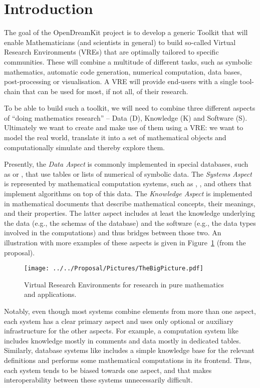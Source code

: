 \section{Introduction}\label{sec:intro}

The goal of the OpenDreamKit project \cite{ODKproposal:on} is to develop a generic Toolkit
that will enable Mathematicians (and scientists in general) to build so-called Virtual
Research Environments (VREs) that are optimally tailored to specific communities. These
will combine a multitude of different tasks, such as symbolic mathematics, automatic code
generation, numerical computation, data bases, post-processing or visualisation. A VRE
will provide end-users with a single tool-chain that can be used for most, if not all, of
their research.

To be able to build such a toolkit, we will need to combine three different aspects of
``doing mathematics research'' -- Data (D), Knowledge (K) and Software (S). Ultimately we want to
create and make use of them using a VRE: we want to model the real world, translate it
into a set of mathematical objects and computationally simulate and thereby explore them.

Presently, the \emph{Data Aspect} is commonly implemented in special databases, such as \LMFDB or \OEIS, that use tables or lists of
numerical of symbolic data. The \emph{Systems Aspect} is represented by mathematical
computation systems, such as \GAP, \SageMath, and others that implement algorithms on top of this data. The
\emph{Knowledge Aspect} is implemented in mathematical documents that describe mathematical concepts, their meanings, and their properties.
The latter aspect includes at least the knowledge underlying the data (e.g., the schemas of the database) and the software (e.g., the data types involved in the computations) and thus bridges between those two. An
illustration with more examples of these aspects is given in
Figure~\ref{fig:thebigpicture} (from the \pn proposal).

\begin{figure}[ht]\centering
  \texttt{[image: ../../Proposal/Pictures/TheBigPicture.pdf]}
  \caption{Virtual Research Environments for research in pure
    mathematics and applications.}
  \label{fig:thebigpicture}
\end{figure}

Notably, even though most systems combine elements from more than one aspect, each system has a clear primary aspect and uses only optional or auxiliary infrastructure for the other aspects.
For example, a computation system like \SageMath includes knowledge mostly in comments and data mostly in dedicated tables.
Similarly, database systems like \LMFDB includes a simple knowledge base for the relevant definitions and performs some mathematical computations in its frontend.
Thus, each system tends to be biased towards one aspect, and that makes interoperability between these systems unnecessarily difficult.

